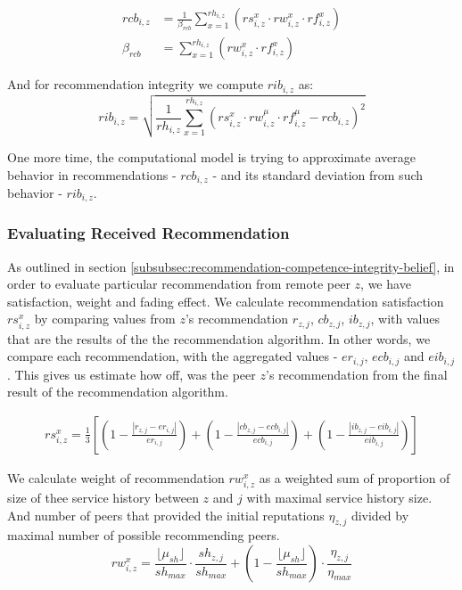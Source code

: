 \begin{equation}
\begin{split}
    rcb_{i, z} &= \frac{1}{\beta_{rcb}} \sum_{x = 1}^{rh_{i, z}}\left(rs_{i,z}^{x} \cdot rw_{i, z}^{x} \cdot rf_{i,z}^{x}\right) \\
    \beta_{rcb} &= \sum_{x = 1}^{rh_{i, z}}\left(rw_{i, z}^{x} \cdot rf_{i,z}^{x}\right)
\end{split}
\end{equation}

\noindent
And for recommendation integrity we compute $rib_{i, z}$ as:
\begin{equation}
    rib_{i, z} = \sqrt{\frac{1}{rh_{i, z}} \sum_{x=1}^{rh_{i,z}} \left(rs_{i,z}^{x} \cdot rw_{i, z}^{\mu} \cdot rf_{i,z}^{\mu} - rcb_{i,z}\right)^{2}}
\end{equation}

\noindent
One more time, the computational model is trying to approximate average behavior in recommendations - $rcb_{i,z}$ - and its standard deviation from such behavior - $rib_{i,z}$.

\subsubsection{Evaluating Received Recommendation}
As outlined in section \ref{subsubsec:recommendation-competence-integrity-belief}, in order to evaluate particular recommendation from remote peer $z$, we have satisfaction, weight and fading effect. 
We calculate recommendation satisfaction $rs^{x}_{i,z}$ by comparing values from $z$'s recommendation $r_{z,j}$, $cb_{z,j}$, $ib_{z,j}$, with values that are the results of the the recommendation algorithm.
In other words, we compare each recommendation, with the aggregated values - $er_{i,j}$, $ecb_{i,j}$ and $eib_{i,j}$. This gives us estimate how off, was the peer $z$'s recommendation from the final result of the recommendation algorithm.

\begin{equation}
\begin{split}
    rs^{x}_{i,z} = \frac{1}{3} \left[ \left(1-\frac{\left|r_{z, j} - er_{i,j}\right|}{er_{i,j}}\right) + \left(1 - \frac{\left|cb_{z, j} - ecb_{i, j}\right|}{ecb_{i, j}}\right) + \left(1 - \frac{\left|ib_{z, j} - eib_{i, j}\right|}{eib_{i, j}}\right) \right]
\end{split}
\end{equation}

We calculate weight of recommendation $rw^{x}_{i,z}$ as a weighted sum of proportion of size of thee service history between $z$ and $j$ with maximal service history size. And number of peers that provided the initial reputations $\eta_{z,j}$ divided by maximal number of possible recommending peers.
\begin{equation}
    rw^{x}_{i,z} = \frac{\lfloor\mu_{sh}\rfloor}{sh_{max}} \cdot \frac{sh_{z, j}}{sh_{max}} + \left(1 - \frac{\lfloor\mu_{sh}\rfloor}{sh_{max}}\right) \cdot \frac{\eta_{z,j}}{\eta_{max}}
\end{equation}

